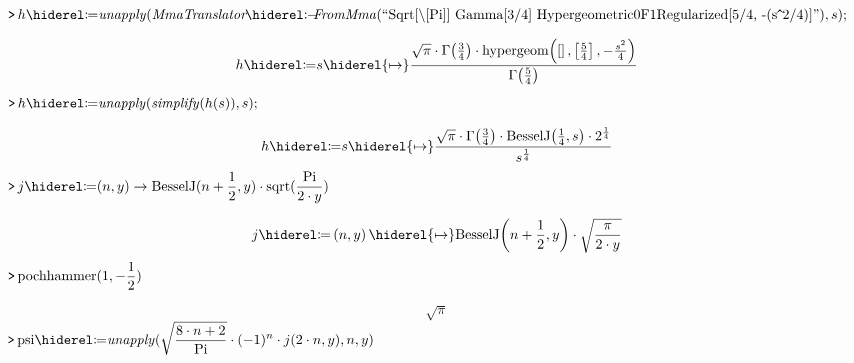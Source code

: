 \documentclass{article}
\begin{document}
\lstset{basicstyle=\ttfamily,breaklines=true,columns=flexible}
\pagestyle{empty}
\mapleinput
{$ \displaystyle \texttt{>\,} h \coloneqq \mathit{unapply} (\mathit{MmaTranslator} \mcoloneq \mathit{FromMma} (\text{``Sqrt[\textbackslash [Pi]] Gamma[3/4] Hypergeometric0F1Regularized[5/4, -(s{\mhat}2/4)]''}),s); $}

\begin{dmath}\label{(1)}
h \coloneqq s \hiderel{\mapsto }\frac{\sqrt{\pi}\cdot \Gamma \! \left(\frac{3}{4}\right)\cdot \mathrm{hypergeom}\! \left(\left[\right],\left[\frac{5}{4}\right],-\frac{s^{2}}{4}\right)}{\Gamma \! \left(\frac{5}{4}\right)}
\end{dmath}
\mapleinput
{$ \displaystyle \texttt{>\,} h \coloneqq \mathit{unapply} (\mathit{simplify} (h (s)),s); $}

\begin{dmath}\label{(2)}
h \coloneqq s \hiderel{\mapsto }\frac{\sqrt{\pi}\cdot \Gamma \! \left(\frac{3}{4}\right)\cdot \mathrm{BesselJ}\! \left(\frac{1}{4},s \right)\cdot 2^{\frac{1}{4}}}{s^{\frac{1}{4}}}
\end{dmath}
\mapleinput
{$ \displaystyle \texttt{>\,} j \coloneqq (n ,y)\rightarrow \mathrm{BesselJ}(n +\frac{1}{2},y)\cdot \mathrm{sqrt}(\frac{\mathrm{Pi}}{2\cdot y}) $}

\begin{dmath}\label{(3)}
j \coloneqq \left(n ,y \right)\hiderel{\mapsto }\mathrm{BesselJ}\! \left(n +\frac{1}{2},y \right)\cdot \sqrt{\frac{\pi}{2\cdot y}}
\end{dmath}
\mapleinput
{$ \displaystyle \texttt{>\,} \mathrm{pochhammer}(1,-\frac{1}{2}) $}

\begin{dmath}\label{(4)}
\sqrt{\pi}
\end{dmath}
\mapleinput
{$ \displaystyle \texttt{>\,} \mathrm{psi}\coloneqq \mathit{unapply} (\sqrt{\frac{8\cdot n +2}{\mathrm{Pi}}}\cdot (-1)^{n}\cdot j (2\cdot n ,y),n ,y)\, $}
\end{document}
